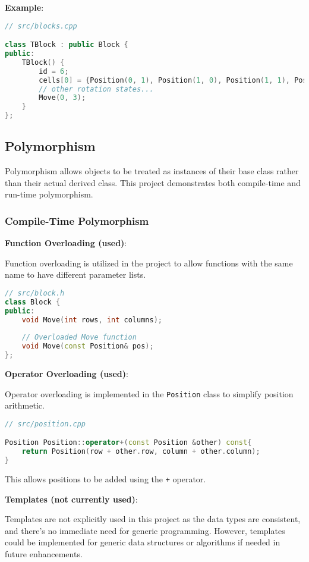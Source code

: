 \documentclass{article}
\begin{document}
\textbf{Example}:

\begin{lstlisting}[language=C++]
// src/blocks.cpp

class TBlock : public Block {
public:
    TBlock() {
        id = 6;
        cells[0] = {Position(0, 1), Position(1, 0), Position(1, 1), Position(1, 2)};
        // other rotation states...
        Move(0, 3);
    }
};
\end{lstlisting}

\subsection{Polymorphism}

Polymorphism allows objects to be treated as instances of their base class rather than their actual derived class. This project demonstrates both compile-time and run-time polymorphism.

\subsubsection{Compile-Time Polymorphism}

\textbf{Function Overloading (used)}:

Function overloading is utilized in the project to allow functions with the same name to have different parameter lists.

\begin{lstlisting}[language=C++]
// src/block.h
class Block {
public:
    void Move(int rows, int columns);
    
    // Overloaded Move function
    void Move(const Position& pos);
};
\end{lstlisting}

\textbf{Operator Overloading (used)}:

Operator overloading is implemented in the \texttt{Position} class to simplify position arithmetic.

\begin{lstlisting}[language=C++]
// src/position.cpp

Position Position::operator+(const Position &other) const{
    return Position(row + other.row, column + other.column);
}
\end{lstlisting}

This allows positions to be added using the \texttt{+} operator.

\textbf{Templates (not currently used)}:

Templates are not explicitly used in this project as the data types are consistent, and there's no immediate need for generic programming. However, templates could be implemented for generic data structures or algorithms if needed in future enhancements.
\end{document}
